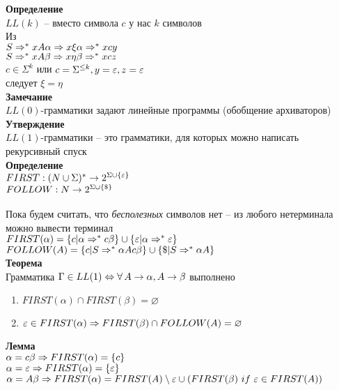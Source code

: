 \documentclass[12pt]{article}
\begin{document}
\textbf{Определение}\\
$LL(k)$ -- вместо символа $c$ у нас $k$ символов\\
Из\\
$S \Rightarrow^* xA\alpha \Rightarrow x\xi\alpha \Rightarrow^* xcy$\\
$S \Rightarrow^* xA\beta \Rightarrow x\eta\beta \Rightarrow^* xcz$\\
$c \in \Sigma^k$ или $c=\Sigma^{\leq k}, y=\varepsilon, z = \varepsilon$\\
следует $\xi = \eta$\\
\textbf{Замечание}\\
$LL(0)$-грамматики задают линейные программы (обобщение архиваторов)\\
\textbf{Утверждение}\\
$LL(1)$-грамматики -- это грамматики, для которых можно написать рекурсивный спуск\\
\textbf{Определение}\\
$FIRST: (N \cup \Sigma)^* \rightarrow 2^{\Sigma \cup \{\varepsilon\}}$\\
$FOLLOW: N \rightarrow 2^{\Sigma \cup \{\$\}}$\\\\
Пока будем считать, что \textit{бесполезных} символов нет -- из любого нетерминала можно вывести терминал\\
$FIRST(\alpha) = \{c | \alpha \Rightarrow^* c\beta\} \cup \{\varepsilon | \alpha \Rightarrow^* \varepsilon\}$\\
$FOLLOW(A) = \{c| S\Rightarrow^* \alpha Ac\beta\} \cup \{\$ | S \Rightarrow^* \alpha A\}$\\
\textbf{Теорема}\\
Грамматика $\Gamma \in LL(1) \Leftrightarrow \forall\, A \rightarrow \alpha, A \rightarrow \beta$ выполнено
\begin{enumerate}
	\item $FIRST(\alpha) \cap FIRST(\beta) = \varnothing$
	\item $\varepsilon \in FIRST(\alpha) \Rightarrow FIRST(\beta) \cap FOLLOW(A) = \varnothing$
\end{enumerate}
\textbf{Лемма}\\
$\alpha = c\beta \Rightarrow FIRST(\alpha) = \{c\}$\\
$\alpha = \varepsilon \Rightarrow FIRST(\alpha) = \{\varepsilon\}$\\
$\alpha = A\beta \Rightarrow FIRST(\alpha) = FIRST(A) \setminus \varepsilon \cup (FIRST(\beta)\ if\ \varepsilon \in FIRST(A))$
\end{document}
